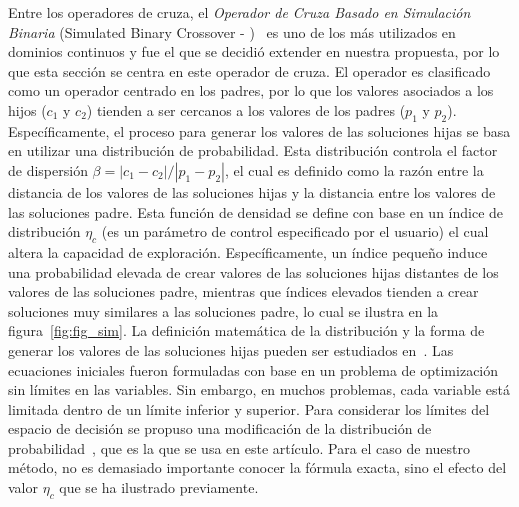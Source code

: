 Entre los operadores de cruza, el \textit{Operador de Cruza Basado en Simulación Binaria} (Simulated Binary Crossover - \SBX{})~\cite{deb1994simulated}
es uno de los más utilizados en dominios continuos y fue el que se decidió extender en nuestra propuesta, por lo que esta sección se centra en este operador de cruza.
%
El operador \SBX{} es clasificado como un operador centrado en los padres, por lo que los valores asociados a los hijos ($c_1$ y $c_2$) 
tienden a ser cercanos a los valores de los padres ($p_1$ y $p_2$).
%
Específicamente, el proceso para generar los valores de las soluciones hijas se basa en utilizar una distribución de probabilidad.
%
Esta distribución controla el factor de dispersión $\beta = |c_1 - c_2 | / |p_1 - p_2|$, el cual es definido como la razón entre la distancia de los valores de las soluciones hijas
y la distancia entre los valores de las soluciones padre.
%
Esta función de densidad se define con base en un índice de distribución $\eta_c$ (es un parámetro de control especificado por el usuario) 
el cual altera la capacidad de exploración.
%
Específicamente, un índice pequeño induce una probabilidad elevada de crear valores de las soluciones hijas distantes de los valores de las 
soluciones padre, mientras que índices elevados tienden a crear soluciones muy similares a las soluciones padre, lo cual se ilustra
en la figura~\ref{fig:fig_sim}.
%
La definición matemática de la distribución y la forma de generar los valores de las soluciones hijas pueden ser estudiados en~\cite{deb1994simulated}.
%
Las ecuaciones iniciales fueron formuladas con base en un problema de optimización sin límites en las variables.
%
Sin embargo, en muchos problemas, cada variable está limitada dentro de un límite inferior y superior.
%
Para considerar los límites del espacio de decisión se propuso una modificación de la distribución de probabilidad~\cite{deb1999self}, 
que es la que se usa en este artículo.
%
Para el caso de nuestro método, no es demasiado importante conocer la fórmula exacta, sino el efecto del valor $\eta_c$ que se ha ilustrado previamente.


%




